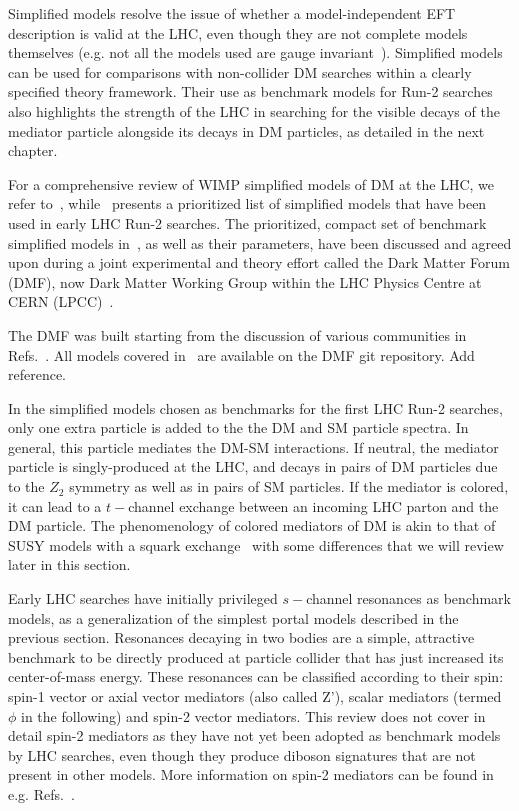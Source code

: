 Simplified models resolve the issue of whether a model-independent EFT description is valid at the LHC, even though they are not complete models themselves (e.g. not all the models used are gauge invariant~\cite{Kahlhoefer:2015bea}). Simplified models can be used for comparisons with non-collider DM searches within a clearly specified theory framework. Their use as benchmark models for Run-2 searches also highlights the strength of the LHC in searching for the visible decays of the mediator particle alongside its decays in DM particles, as detailed in the next chapter. 

For a comprehensive review of WIMP simplified models of DM at the LHC, we refer to~\cite{Arcadi:2017kky}, while~\cite{Abercrombie:2015wmb} presents a prioritized list of simplified models that have been used in early LHC Run-2 searches. The prioritized, compact set of benchmark simplified models in~\cite{Abercrombie:2015wmb}, as well as their parameters, have been discussed and agreed upon during a joint experimental and theory effort called the Dark Matter Forum (DMF), now Dark Matter Working Group within the LHC Physics Centre at CERN (LPCC)~\cite{DMWG}. 

\begin{marginnote}[]
The DMF was built starting from the discussion of various communities in Refs.~\cite{Yavin:14092893,Malik:2014ggr,Abdallah:2015ter}. All models covered in~\cite{Abercrombie:2015wmb} are available on the DMF git repository. Add reference. 
\end{marginnote}

In the simplified models chosen as benchmarks for the first LHC Run-2 searches, only one extra particle is added to the the DM and SM particle spectra. In general, this particle mediates the DM-SM interactions. If neutral, the mediator particle is singly-produced at the LHC, and decays in pairs of DM particles due to the $Z_2$ symmetry as well as in pairs of SM particles. If the mediator is colored, it can lead to a $t-$channel exchange between an incoming LHC parton and the DM particle. The phenomenology of colored mediators of DM is akin to that of SUSY models with a squark exchange~\cite{Papucci:2014iwa,An:2013xka,Bell:2012rg} with some differences that we will review later in this section. 

Early LHC searches have initially privileged $s-$channel resonances as benchmark models, as a generalization of the simplest portal models described in the previous section. Resonances decaying in two bodies
are a simple, attractive benchmark to be directly produced at particle collider that has just increased its center-of-mass energy. These resonances can be classified according to their spin: spin-1 vector or axial vector mediators (also called Z'), scalar mediators (termed $\phi$ in the following) and spin-2 vector mediators. This review does not cover in detail spin-2 mediators as they have not yet been adopted as benchmark models by LHC searches, even though they produce diboson signatures that are not present in other models. More information on spin-2 mediators can be found in e.g. Refs.~\cite{Kraml:2017atm,Han:2015cty}.

